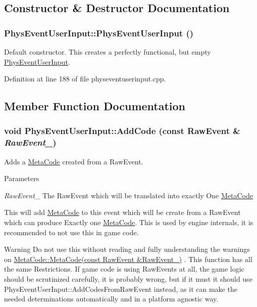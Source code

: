 \subsection{Constructor \& Destructor Documentation}
\hypertarget{classPhysEventUserInput_a6f8eaf698e8109d5cb30f2f17044f1ba}{
\subsubsection[{PhysEventUserInput}]{\setlength{\rightskip}{0pt plus 5cm}PhysEventUserInput::PhysEventUserInput ()}}
\label{dc/d0e/classPhysEventUserInput_a6f8eaf698e8109d5cb30f2f17044f1ba}


Default constructor. This creates a perfectly functional, but empty \hyperlink{classPhysEventUserInput}{PhysEventUserInput}. 

Definition at line 188 of file physeventuserinput.cpp.

\subsection{Member Function Documentation}
\hypertarget{classPhysEventUserInput_a385a4f7a6e88be43b6ba1ffc2a1bb5e3}{
\subsubsection[{AddCode}]{\setlength{\rightskip}{0pt plus 5cm}void PhysEventUserInput::AddCode (const RawEvent \& {\em RawEvent\_\-})}}
\label{dc/d0e/classPhysEventUserInput_a385a4f7a6e88be43b6ba1ffc2a1bb5e3}


Adds a \hyperlink{classMetaCode}{MetaCode} created from a RawEvent. 
\begin{DoxyParams}{Parameters}
\item[{\em RawEvent\_\-}]The RawEvent which will be translated into exactly One \hyperlink{classMetaCode}{MetaCode}\end{DoxyParams}
This will add \hyperlink{classMetaCode}{MetaCode} to this event which will be create from a RawEvent which can produce Exactly one \hyperlink{classMetaCode}{MetaCode}. This is used by engine internals, it is recommended to not use this in game code. \begin{DoxyWarning}{Warning}
Do not use this without reading and fully understanding the warnings on \hyperlink{classMetaCode_a87b260ce7ee3a66c75320c0fc37cdc0a}{MetaCode::MetaCode(const RawEvent \&RawEvent\_\-)} . This function has all the same Restrictions. If game code is using RawEvents at all, the game logic should be scrutinized carefully, it is probably wrong, but if it must it should use PhysEventUserInput::AddCodesFromRawEvent instead, as it can make the needed determinations automatically and in a platform agnostic way. 
\end{DoxyWarning}



